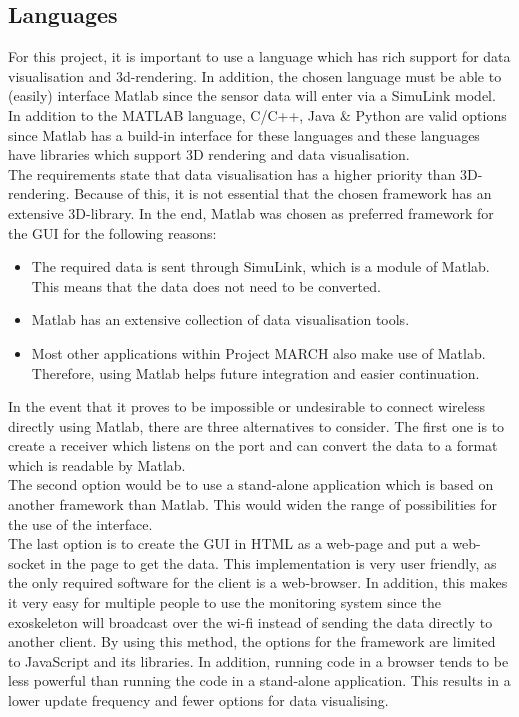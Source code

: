 \subsection{Languages}\label{sec:Languages}
For this project, it is important to use a language which has rich support for data visualisation and 3d-rendering. In addition, the chosen language must be able to (easily) interface Matlab since the sensor data will enter via a SimuLink model. In addition to the MATLAB language, C/C++, Java \& Python are valid options since Matlab has a build-in interface for these languages and these languages have libraries which support 3D rendering and data visualisation.\\ 


The requirements state that data visualisation has a higher priority than 3D-rendering. Because of this, it is not essential that the chosen framework has an extensive 3D-library. In the end, Matlab was chosen as preferred framework for the GUI for the following reasons:
\begin{itemize}
	\item The required data is sent through SimuLink, which is a module of Matlab. This means that the data does not need to be converted.
	\item Matlab has an extensive collection of data visualisation tools.
	\item Most other applications within Project MARCH also make use of Matlab. Therefore, using Matlab helps future integration and easier continuation.
\end{itemize}
In the event that it proves to be impossible or undesirable to connect wireless directly using Matlab, there are three alternatives to consider. The first one is to create a receiver which listens on the port and can convert the data to a format which is readable by Matlab.
\\The second option would be to use a stand-alone application which is based on another framework than Matlab. This would widen the range of possibilities for the use of the interface.
\\The last option is to create the GUI in HTML as a web-page and put a web-socket in the page to get the data. This implementation is very user friendly, as the only required software for the client is a web-browser. In addition, this makes it very easy for multiple people to use the monitoring system since the exoskeleton will broadcast over the wi-fi instead of sending the data directly to another client. By using this method, the options for the framework are limited to JavaScript and its libraries. In addition, running code in a browser tends to be less powerful than running the code in a stand-alone application. This results in a lower update frequency and fewer options for data visualising.

